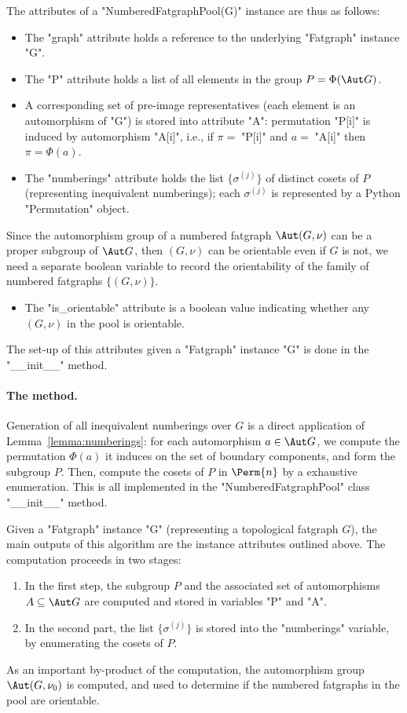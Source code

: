 The attributes of a "NumberedFatgraphPool(G)" instance are thus as
follows:
\begin{itemize}
\item The "graph" attribute holds a reference to the underlying
  "Fatgraph" instance "G".
\item The "P" attribute holds a list of all elements in the group $P =
  \Phi(\Aut G)$.
\item A corresponding set of pre-image representatives (each element
  is an automorphism of "G") is stored into attribute "A": permutation
  "P[i]" is induced by automorphism "A[i]", i.e., if $\pi=\;$"P[i]"
  and $a=\;$"A[i]" then $\pi = \Phi(a)$.
\item The "numberings" attribute holds the list $\{ \sigma^{(j)} \}$
  of distinct cosets of $P$
  (representing inequivalent numberings); each $\sigma^{(j)}$ is
  represented by a Python "Permutation" object.
\end{itemize}
Since the automorphism group of a numbered fatgraph $\Aut (G, \nu)$
can be a proper subgroup of $\Aut G$, then $(G,\nu)$ can be orientable
even if $G$ is not, we need a separate boolean variable to record the
orientability of the family of numbered fatgraphs $\{ (G, \nu) \}$.
\begin{itemize}
\item The "is_orientable" attribute is a boolean value indicating
  whether any $(G,\nu)$ in the pool is orientable.
\end{itemize}

The set-up of this attributes given a "Fatgraph" instance "G" is done
in the "__init__" method.

\paragraph{The  method.}
Generation of all inequivalent numberings over $G$ is a direct
application of Lemma~\ref{lemma:numberings}: for each automorphism $a
\in \Aut G$, we compute the permutation $\Phi(a)$ it induces on the
set of boundary components, and form the subgroup $P$.  Then, compute
the cosets of $P$ in $\Perm{n}$ by a exhaustive enumeration.
This is all implemented in the "NumberedFatgraphPool" class "__init__"
method.  

Given a "Fatgraph" instance "G" (representing a topological
fatgraph $G$), the main outputs of this algorithm are the instance
attributes outlined above.  The computation proceeds in two stages:
\begin{enumerate}
\item In the first step, the subgroup $P$ and the associated set of
  automorphisms $A \subseteq \Aut G$ are computed and stored in
  variables "P" and "A".
\item In the second part, the list $\{ \sigma^{(j)} \}$ is stored into
  the "numberings" variable, by enumerating the cosets of $P$.
\end{enumerate}
As an important by-product of the computation, the automorphism group
$\Aut (G, \nu_0)$ is computed, and used to determine if the numbered
fatgraphs in the pool are orientable.

